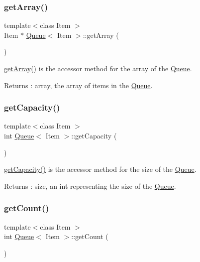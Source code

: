 \subsubsection{\texorpdfstring{get\+Array()}{getArray()}}
{\footnotesize\ttfamily template$<$class Item $>$ \\
Item $\ast$ \hyperlink{class_queue}{Queue}$<$ Item $>$\+::get\+Array (\begin{DoxyParamCaption}{ }\end{DoxyParamCaption})}

\hyperlink{class_queue_ab1da66d1953215740872a16e8209b105}{get\+Array()} is the accessor method for the array of the \hyperlink{class_queue}{Queue}. \begin{DoxyReturn}{Returns}
\+: array, the array of items in the \hyperlink{class_queue}{Queue}. 
\end{DoxyReturn}
\mbox{\label{class_queue_ae347bb155f5513bc330b354aeec625f8}} 
\subsubsection{\texorpdfstring{get\+Capacity()}{getCapacity()}}
{\footnotesize\ttfamily template$<$class Item $>$ \\
int \hyperlink{class_queue}{Queue}$<$ Item $>$\+::get\+Capacity (\begin{DoxyParamCaption}{ }\end{DoxyParamCaption})}

\hyperlink{class_queue_ae347bb155f5513bc330b354aeec625f8}{get\+Capacity()} is the accessor method for the size of the \hyperlink{class_queue}{Queue}. \begin{DoxyReturn}{Returns}
\+: size, an int representing the size of the \hyperlink{class_queue}{Queue}. 
\end{DoxyReturn}
\mbox{\label{class_queue_af7cc83c36b93e41575dbe938d4ef3f2b}} 
\subsubsection{\texorpdfstring{get\+Count()}{getCount()}}
{\footnotesize\ttfamily template$<$class Item $>$ \\
int \hyperlink{class_queue}{Queue}$<$ Item $>$\+::get\+Count (\begin{DoxyParamCaption}{ }\end{DoxyParamCaption})}

